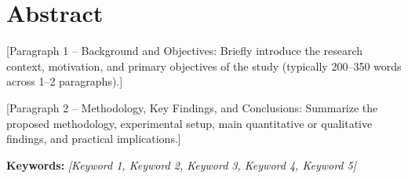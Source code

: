 
\chapter*{Abstract}

[Paragraph 1 -- Background and Objectives: Briefly introduce the research context, motivation, and primary objectives of the study (typically 200--350 words across 1--2 paragraphs).]

[Paragraph 2 -- Methodology, Key Findings, and Conclusions: Summarize the proposed methodology, experimental setup, main quantitative or qualitative findings, and practical implications.]

\vspace{0.8cm}
\noindent\textbf{Keywords:} \textit{[Keyword 1, Keyword 2, Keyword 3, Keyword 4, Keyword 5]}

